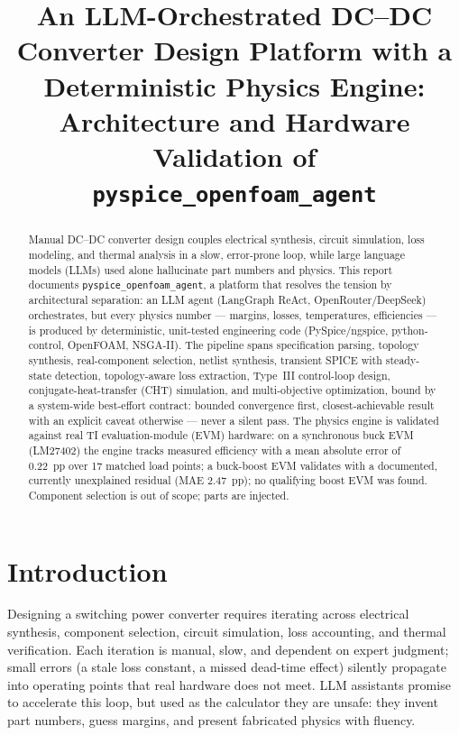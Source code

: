 \documentclass[conference]{IEEEtran}
\begin{document}
\title{An LLM-Orchestrated DC--DC Converter Design Platform with a
Deterministic Physics Engine: Architecture and Hardware Validation of
\texttt{pyspice\_openfoam\_agent}}

\author{
}

\maketitle

\begin{abstract}
Manual DC--DC converter design couples electrical synthesis, circuit
simulation, loss modeling, and thermal analysis in a slow, error-prone
loop, while large language models (LLMs) used alone hallucinate part
numbers and physics. This report documents \texttt{pyspice\_openfoam\_agent},
a platform that resolves the tension by architectural separation: an LLM
agent (LangGraph ReAct, OpenRouter/DeepSeek) orchestrates, but every
physics number --- margins, losses, temperatures, efficiencies --- is
produced by deterministic, unit-tested engineering code (PySpice/ngspice,
python-control, OpenFOAM, NSGA-II). The pipeline spans specification
parsing, topology synthesis, real-component selection, netlist synthesis,
transient SPICE with steady-state detection, topology-aware loss
extraction, Type~III control-loop design, conjugate-heat-transfer (CHT)
simulation, and multi-objective optimization, bound by a system-wide
best-effort contract: bounded convergence first, closest-achievable
result with an explicit caveat otherwise --- never a silent pass. The
physics engine is validated against real TI evaluation-module (EVM)
hardware: on a synchronous buck EVM (LM27402) the engine tracks measured
efficiency with a mean absolute error of \SI{0.22}{pp} over 17 matched
load points; a buck-boost EVM validates with a documented, currently
unexplained residual (MAE \SI{2.47}{pp}); no qualifying boost EVM was
found. Component selection is out of scope; parts are injected.
\end{abstract}

\section{Introduction}
Designing a switching power converter requires iterating across
electrical synthesis, component selection, circuit simulation, loss
accounting, and thermal verification. Each iteration is manual,
slow, and dependent on expert judgment; small errors (a stale loss
constant, a missed dead-time effect) silently propagate into operating
points that real hardware does not meet. LLM assistants promise to
accelerate this loop, but used as the calculator they are unsafe: they
invent part numbers, guess margins, and present fabricated physics with
fluency.
\end{document}
